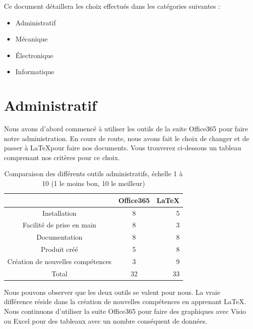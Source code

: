 \documentclass[
	a4paper,									%
	11pt,										%
	twoside,									%
	openright,									%
	notitlepage,									%
	parskip=half,								%
]{scrreprt}										%
\begin{document}
Ce document détaillera les choix effectués dans les catégories suivantes : 

\begin{itemize}
	\item Administratif
	\item Mécanique
	\item Électronique
	\item Informatique
\end{itemize}



\chapter{Administratif}

Nous avons d'abord commencé à utiliser les outils de la suite Office365 pour faire notre administration. 
En cours de route, nous avons fait le choix de changer et de passer à \LaTeX pour faire nos documents. 
Vous trouverez ci-dessous un tableau comprenant nos critères pour ce choix. 

\begin{table}[h!]
    \begin{center}
        \vspace{5mm}
        \label{tab:table1}
        \begin{tabular}{c|c|r} %
            \toprule
            \textbf{ } & \textbf{Office365} & \textbf{\LaTeX}\\
            \midrule
            Installation & 8 & 5\\
            Facilité de prise en main & 8 & 3\\
            Documentation & 8 & 8 \\
            Produit créé & 5 & 8 \\
			Création de nouvelles compétences & 3 & 9\\
			\midrule
			Total & 32 & 33\\
            \bottomrule
			
        \end{tabular}
    \end{center}    
	\caption{Comparaison des différents outils administratifs, échelle 1 à 10 (1 le moins bon, 10 le meilleur)}
\end{table}

Nous pouvons observer que les deux outils se valent pour nous. La vraie différence réside dans la création
de nouvelles compétences en apprenant \LaTeX. Nous continuons d'utiliser la suite Office365 pour faire 
des graphiques avec Visio ou Excel pour des tableaux avec un nombre conséquent de données. \par
\end{document}
